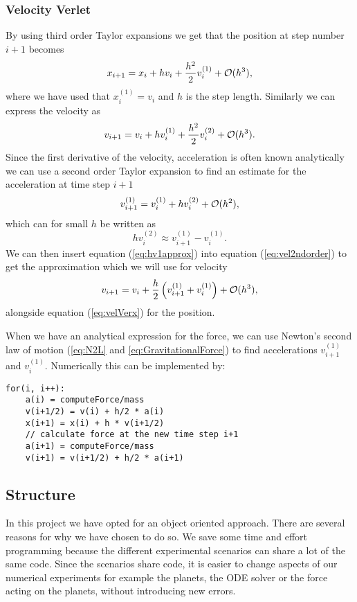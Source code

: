 \documentclass[norsk,a4paper,12pt]{article}
\begin{document}
{\subsubsection{Velocity Verlet}
By using third order Taylor expansions we get that the position at step number $i+1$ becomes \begin{equation}
x_{i+1} = x_i + h v_i + \frac{h^2}{2}v_i^{(1)} + {\cal O}(h^3),
\label{eq:velVerx}
\end{equation}
where we have used that $x_i^{(1)} = v_i$ and $h$ is the step length. Similarly we can express the velocity as
\begin{equation}
v_{i+1} = v_i + h v_i^{(1)} + \frac{h^2}{2}v_i^{(2)} + {\cal O}(h^3).
\label{eq:vel2ndorder}
\end{equation}
Since the first derivative of the velocity, acceleration is often known analytically we can use a second order Taylor expansion to find an estimate for the acceleration at time step $i+1$
$$v_{i+1}^{(1)} = v_i^{(1)} + hv_i^{(2)} + {\cal O}(h^2), $$
which can for small $h$ be written as 
\begin{equation}
hv_i^{(2)} \approx v_{i+1}^{(1)}- v_i^{(1)}.
\label{eq:hv1approx}
\end{equation}
We can then insert equation (\ref{eq:hv1approx}) into equation (\ref{eq:vel2ndorder}) to get the approximation which we will use for velocity
\begin{equation}
v_{i+1} = v_i + \frac{h}{2}\left(v_{i+1}^{(1)} + v_i^{(1)}\right) + {\cal O}(h^3),
\label{eq:velVerv}
\end{equation}
alongside equation (\ref{eq:velVerx}) for the position. 

When we have an analytical expression for the force, we can use Newton's second law of motion (\ref{eq:N2L} and \ref{eq:GravitationalForce}) to find accelerations $v_{i+1}^{(1)}$ and $v_{i}^{(1)}$. Numerically this can be implemented by:
\begin{lstlisting}
for(i, i++):
	a(i) = computeForce/mass
	v(i+1/2) = v(i) + h/2 * a(i)
	x(i+1) = x(i) + h * v(i+1/2)
	// calculate force at the new time step i+1
	a(i+1) = computeForce/mass
	v(i+1) = v(i+1/2) + h/2 * a(i+1)
\end{lstlisting}
\subsection{Structure}
In this project we have opted for an object oriented approach. There are several reasons for why we have chosen to do so. We save some time and effort programming because the different experimental scenarios can share a lot of the same code. Since the scenarios share code, it is easier to change aspects of our numerical experiments for example the planets, the ODE solver or the force acting on the planets, without introducing new errors. 

}
\end{document}
